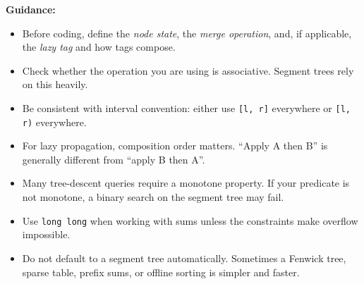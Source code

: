 \documentclass[11pt]{article}
\begin{document}
\noindent
\textbf{Guidance:}
\begin{itemize}
    \item Before coding, define the \emph{node state}, the \emph{merge
    operation}, and, if applicable, the \emph{lazy tag} and how tags compose.
    \item Check whether the operation you are using is associative. Segment
    trees rely on this heavily.
    \item Be consistent with interval convention: either use
    \texttt{[l, r]} everywhere or \texttt{[l, r)} everywhere.
    \item For lazy propagation, composition order matters. ``Apply A then B''
    is generally different from ``apply B then A''.
    \item Many tree-descent queries require a monotone property. If your
    predicate is not monotone, a binary search on the segment tree may fail.
    \item Use \texttt{long long} when working with sums unless the constraints
    make overflow impossible.
    \item Do not default to a segment tree automatically. Sometimes a Fenwick
    tree, sparse table, prefix sums, or offline sorting is simpler and faster.
\end{itemize}
\end{document}
